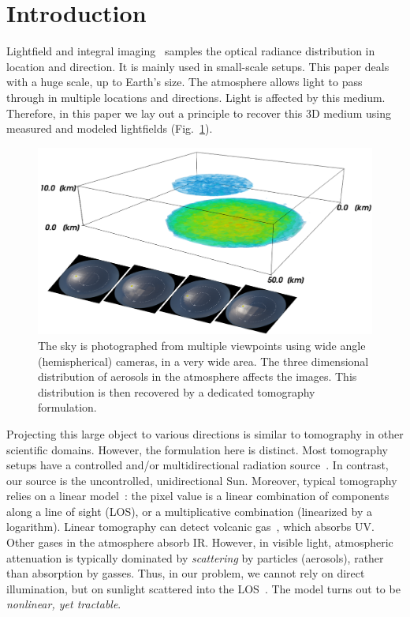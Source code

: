 \documentclass[10pt,twocolumn,letterpaper]{article}
\newcommand{\yoavcomment}[1]{}
\renewcommand{\yoavcomment}[1]{#1} %
\begin{document}
\section{Introduction}
\label{sec:intro}

Lightfield and integral imaging~\cite{bishop,horstmeyer,kim,levoy,Perwass} samples the optical radiance distribution in location and direction. It is mainly used in small-scale setups. This paper deals with a huge scale, up to Earth's size.
The atmosphere allows light to pass through in multiple locations and directions. Light is affected by this medium. Therefore, in this paper we lay out a principle to recover this 3D medium using measured and modeled lightfields (Fig.~\ref{fig:front}).
\begin{figure}[t!]
  \centering
  \yoavcomment{\includegraphics[width=\columnwidth]{images/front_img.pdf}}
    \caption{\small The sky is photographed from multiple viewpoints using wide angle (hemispherical) cameras, in a very wide area. The three dimensional distribution of aerosols in the atmosphere affects the images. This distribution is then recovered by a dedicated tomography formulation.}
  \label{fig:front}
\end{figure}

Projecting this large object to various directions is similar to tomography in other scientific domains. However, the formulation here is distinct. Most tomography setups have a controlled and/or multidirectional radiation source~\cite{gorbunov,messer}. In contrast, our source is the uncontrolled, unidirectional Sun. Moreover, typical tomography relies on a linear model~\cite{gregson}: the pixel value is a linear combination of components along a line of sight (LOS), or a multiplicative combination (linearized by a logarithm). Linear tomography can detect volcanic gas~\cite{wright}, which absorbs UV. Other gases in the atmosphere absorb IR. However, in visible light, atmospheric attenuation is typically dominated by {\em scattering} by particles (aerosols), rather than absorption by gasses. Thus, in our problem, we cannot rely on direct illumination, but on sunlight scattered into the LOS~\cite{Seidel}.  The model turns out to be {\em nonlinear, yet tractable}.
\end{document}
